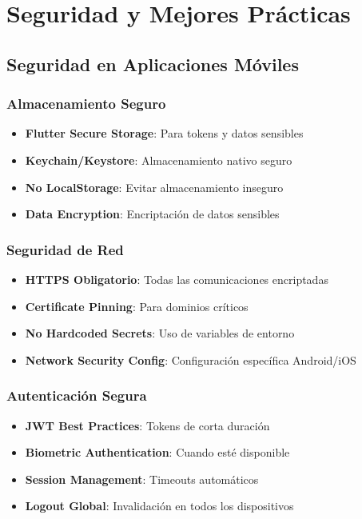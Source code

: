 \documentclass[12pt]{article}
\begin{document}
\section{Seguridad y Mejores Prácticas}
\label{sec:seguridad}

\subsection{Seguridad en Aplicaciones Móviles}

\subsubsection{Almacenamiento Seguro}
\begin{itemize}
    \item \textbf{Flutter Secure Storage}: Para tokens y datos sensibles
    \item \textbf{Keychain/Keystore}: Almacenamiento nativo seguro
    \item \textbf{No LocalStorage}: Evitar almacenamiento inseguro
    \item \textbf{Data Encryption}: Encriptación de datos sensibles
\end{itemize}

\subsubsection{Seguridad de Red}
\begin{itemize}
    \item \textbf{HTTPS Obligatorio}: Todas las comunicaciones encriptadas
    \item \textbf{Certificate Pinning}: Para dominios críticos
    \item \textbf{No Hardcoded Secrets}: Uso de variables de entorno
    \item \textbf{Network Security Config}: Configuración específica Android/iOS
\end{itemize}

\subsubsection{Autenticación Segura}
\begin{itemize}
    \item \textbf{JWT Best Practices}: Tokens de corta duración
    \item \textbf{Biometric Authentication}: Cuando esté disponible
    \item \textbf{Session Management}: Timeouts automáticos
    \item \textbf{Logout Global}: Invalidación en todos los dispositivos
\end{itemize}
\end{document}
